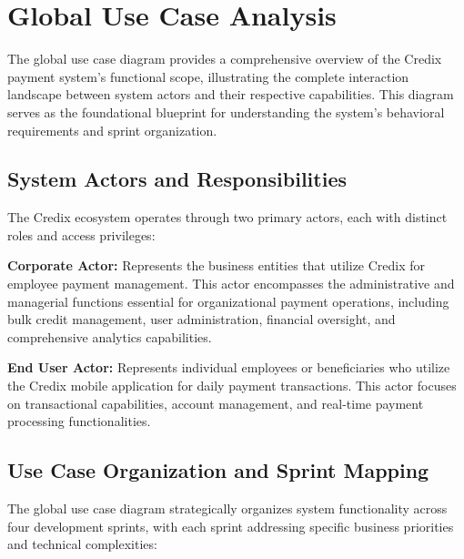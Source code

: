 \section{Global Use Case Analysis}

The global use case diagram provides a comprehensive overview of the Credix payment system's functional scope, illustrating the complete interaction landscape between system actors and their respective capabilities. This diagram serves as the foundational blueprint for understanding the system's behavioral requirements and sprint organization.

\subsection{System Actors and Responsibilities}

The Credix ecosystem operates through two primary actors, each with distinct roles and access privileges:

\textbf{Corporate Actor:} Represents the business entities that utilize Credix for employee payment management. This actor encompasses the administrative and managerial functions essential for organizational payment operations, including bulk credit management, user administration, financial oversight, and comprehensive analytics capabilities.

\textbf{End User Actor:} Represents individual employees or beneficiaries who utilize the Credix mobile application for daily payment transactions. This actor focuses on transactional capabilities, account management, and real-time payment processing functionalities.

\subsection{Use Case Organization and Sprint Mapping}

The global use case diagram strategically organizes system functionality across four development sprints, with each sprint addressing specific business priorities and technical complexities:

